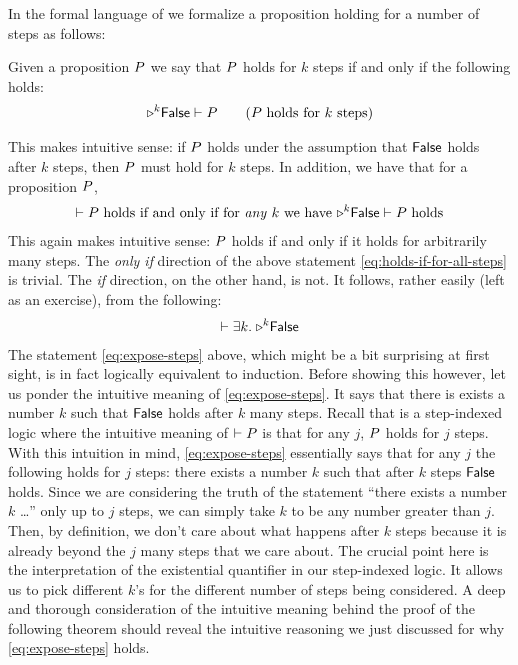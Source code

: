 In the formal language of \Iris{} we formalize a proposition holding for a number of steps as follows:
\begin{definition} Given a proposition $P$ we say that $P$ holds for $k$ steps if and only if the following holds:
\begin{align*}
  {\later}^{k} \FALSE \proves \prop \tag{$\prop$ holds for $k$ steps}
\end{align*}
\end{definition}
This makes intuitive sense: if $P$ holds under the assumption that $\textsf{\upshape False}$ holds after $k$ steps, then $P$ must hold for $k$ steps.
In addition, we have that for a proposition $P$,
\begin{align}
\vdash P \text{ holds if and only if for \emph{any} } k \text{ we have } {\mathop{{\triangleright}}}^{k} \textsf{\upshape False} \vdash P \text{ holds} \label{eq:holds-if-for-all-steps}
\end{align}
This again makes intuitive sense: $P$ holds if and only if it holds for arbitrarily many steps.
The \emph{only if} direction of the above statement \eqref{eq:holds-if-for-all-steps} is trivial.
The \emph{if} direction, on the other hand, is not.
It follows, rather easily (left as an exercise), from the following:
\begin{align}
  \vdash \exists k.\; {\mathop{{\triangleright}}}^{k} \textsf{\upshape False} \label{eq:expose-steps}
\end{align}
The statement \eqref{eq:expose-steps} above, which might be a bit surprising at first sight, is in fact logically equivalent to  induction.
Before showing this however, let us ponder the intuitive meaning of \eqref{eq:expose-steps}.
It says that there is exists a number $k$ such that $\textsf{\upshape False}$ holds after $k$ many steps.
Recall that \Iris{} is a step-indexed logic where the intuitive meaning of $\vdash P$ is that for any $j$, $P$ holds for $j$ steps.
With this intuition in mind, \eqref{eq:expose-steps} essentially says that for any $j$ the following holds for $j$ steps: there exists a number $k$ such that after $k$ steps $\textsf{\upshape False}$ holds.
Since we are considering the truth of the statement ``there exists a number $k$ \dots'' only up to $j$ steps, we can simply take $k$ to be any number greater than $j$.
Then, by definition, we don't care about what happens after $k$ steps because it is already beyond the $j$ many steps that we care about.
The crucial point here is the interpretation of the existential quantifier in our step-indexed logic.
It allows us to pick different $k$'s for the different number of steps being considered.
A deep and thorough consideration of the intuitive meaning behind the proof of the following theorem should reveal the intuitive reasoning we just discussed for why \eqref{eq:expose-steps} holds.

